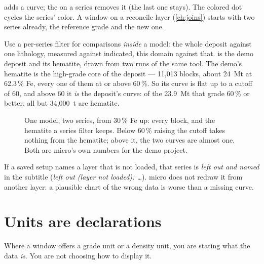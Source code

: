  adds a curve; the  on a series removes it (the last one stays). The colored dot cycles the series' color. A window on a reconcile layer (\cref{ch:joins}) starts with two series already, the reference grade and the new one.

Use a per-series filter for comparisons \emph{inside} a model: the whole deposit against one lithology, measured against indicated, this domain against that.  is the demo deposit and its hematite, drawn from two runs of the same tool. The demo's hematite is the high-grade core of the deposit — 11,013 blocks, about 24~Mt at 62.3\,\% Fe, every one of them at or above 60\,\%. So its curve is flat up to a cutoff of 60, and above 60 it \emph{is} the deposit's curve: of the 23.9~Mt that grade 60\,\% or better, all but 34,000~t are hematite.

\begin{figure}[htbp]\centering
{}
\caption{One model, two series, from 30\,\% Fe up: every block, and the hematite a series filter keeps. Below 60\,\% raising the cutoff takes nothing from the hematite; above it, the two curves are almost one. Both are micro's own numbers for the demo project.}\label{fig:analysis-series-filter}
\end{figure}

If a saved setup names a layer that is not loaded, that series is \emph{left out and named} in the subtitle (\emph{left out (layer not loaded): …}). micro does not redraw it from another layer: a plausible chart of the wrong data is worse than a missing curve.

\section{Units are declarations}\label{sec:analysis-units}
Where a window offers a grade unit or a density unit, you are stating what the data \emph{is}. You are not choosing how to display it.

